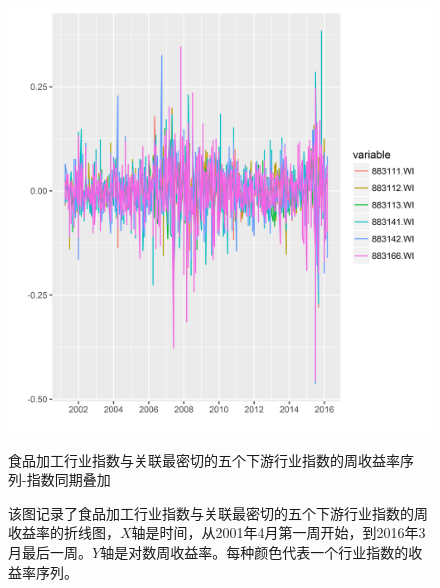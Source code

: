 \documentclass{sysuthesis}
\begin{document}
\begin{figure}[htbp]
\centering
\includegraphics[scale=0.8]{image/883111-topk-lower-plus-one-weeklyyield-combined.png}
\caption{食品加工行业指数与关联最密切的五个下游行业指数的周收益率序列-指数同期叠加}
\caption*{\footnotesize 该图记录了食品加工行业指数与关联最密切的五个下游行业指数的周收益率的折线图，$X$轴是时间，从2001年4月第一周开始，到2016年3月最后一周。$Y$轴是对数周收益率。每种颜色代表一个行业指数的收益率序列。}
\label{fig:883111-topk-lower-plus-one-weeklyyield-combined}
\end{figure}
\end{document}
